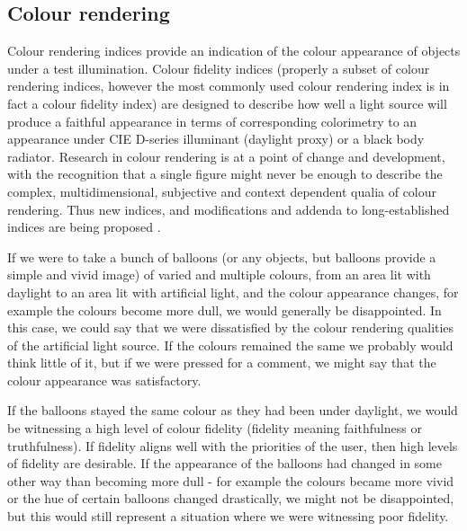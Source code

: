 \subsection{Colour rendering}

Colour rendering indices provide an indication of the colour appearance of objects under a test illumination. Colour fidelity indices (properly a subset of colour rendering indices, however the most commonly used colour rendering index is in fact a colour fidelity index) are designed to describe how well a light source will produce a faithful appearance in terms of corresponding colorimetry to an appearance under \gls{CIE} D-series illuminant (daylight proxy) or a black body radiator. %
Research in colour rendering is at a point of change and development, with the recognition that a single figure might never be enough to describe the complex, multidimensional, subjective and context dependent qualia of colour rendering\citep{rea_color_2008}. Thus new indices, and modifications and addenda to long-established indices are being proposed \citep{smet_memory_2012,davis_color_2010,rea_practical_2010,color_metric_task_group_of_the_ies_ies_2015,teunissen_characterising_2016}.

If we were to take a bunch of balloons (or any objects, but balloons provide a simple and vivid image) of varied and multiple colours, from an area lit with daylight to an area lit with artificial light, and the colour appearance changes, for example the colours become more dull, we would generally be disappointed. In this case, we could say that we were dissatisfied by the colour rendering qualities of the artificial light source. If the colours remained the same we probably would think little of it, but if we were pressed for a comment, we might say that the colour appearance was satisfactory. 

If the balloons stayed the same colour as they had been under daylight, we would be witnessing a high level of colour fidelity (fidelity meaning faithfulness or truthfulness). If fidelity aligns well with the priorities of the user, then high levels of fidelity are desirable. If the appearance of the balloons had changed in some other way than becoming more dull - for example the colours became more vivid or the hue of certain balloons changed drastically, we might not be disappointed, but this would still represent a situation where we were witnessing poor fidelity.

